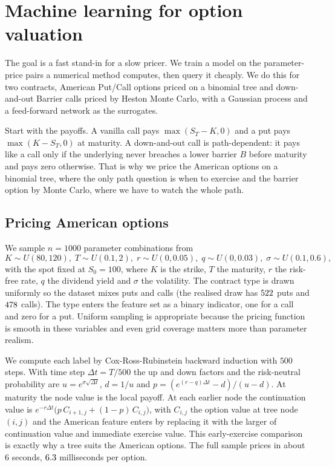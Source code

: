 \documentclass[12pt,a4paper]{article}
\begin{document}
\clearpage
\section{Machine learning for option valuation}

The goal is a fast stand-in for a slow pricer. We train a model on the
parameter-price pairs a numerical method computes, then query it cheaply. We do
this for two contracts, American Put/Call options priced on a binomial tree and
down-and-out Barrier calls priced by Heston Monte Carlo, with a Gaussian process
and a feed-forward network as the surrogates.

Start with the payoffs. A vanilla call pays
$\max(S_T-K,0)$ and a put pays $\max(K-S_T,0)$ at maturity. A down-and-out call
is path-dependent: it pays like a call only if the underlying never breaches a
lower barrier $B$ before maturity and pays zero otherwise. That is why we price
the American options on a binomial tree, where the only path question is when to
exercise and the barrier option by Monte Carlo, where we have to watch the
whole path.

\subsection{Pricing American options}
We sample $n=1000$ parameter combinations from
\[
K \sim U(80,120),\;
T \sim U(0.1,2),\;
r \sim U(0,0.05),\;
q \sim U(0,0.03),\;
\sigma \sim U(0.1,0.6),
\]
with the spot fixed at $S_0=100$, where $K$ is the strike, $T$ the maturity,
$r$ the risk-free rate, $q$ the dividend yield and $\sigma$ the volatility. The
contract type is drawn uniformly so the dataset mixes puts and calls (the
realised draw has $522$ puts and $478$ calls). The type enters the
feature set
as a binary indicator, one for a call and zero for a put. Uniform sampling is
appropriate
because the pricing function is smooth in these variables and even grid coverage
matters more than parameter realism.

We compute each label by Cox-Ross-Rubinstein backward induction with $500$
steps. With time step $\Delta t=T/500$ the up and down factors and the
risk-neutral probability are $u=e^{\sigma\sqrt{\Delta t}}$, $d=1/u$ and
$p=(e^{(r-q)\Delta t}-d)/(u-d)$. At maturity the node value is the local payoff.
At each earlier node the continuation value is
$e^{-r\Delta t}\big(p\,C_{i+1,j}+(1-p)\,C_{i,j}\big)$, with $C_{i,j}$ the option
value at tree node $(i,j)$ and the American feature
enters by replacing it with the larger of continuation value and immediate
exercise value. This early-exercise comparison is exactly why a tree suits the
American options. The full sample prices in about $6$
seconds, $6.3$ milliseconds per option.
\end{document}
